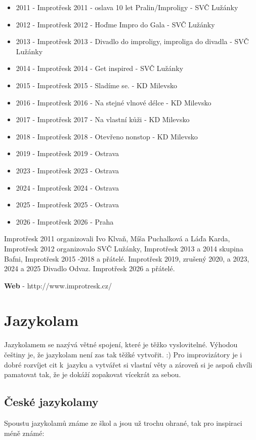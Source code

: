 \begin{itemize}
\item 2011 - Improtřesk 2011 - oslava 10 let Pralin/Improligy - SVČ Lužánky
\item 2012 - Improtřesk 2012 - Hoďme Impro do Gala - SVČ Lužánky
\item 2013 - Improtřesk 2013 - Divadlo do improligy, improliga do divadla - SVČ Lužánky
\item 2014 - Improtřesk 2014 - Get inspired - SVČ Lužánky
\item 2015 - Improtřesk 2015 - Sladíme se. - KD Milevsko
\item 2016 - Improtřesk 2016 - Na stejné vlnové délce - KD Milevsko
\item 2017 - Improtřesk 2017 - Na vlastní kůži - KD Milevsko
\item 2018 - Improtřesk 2018 - Otevřeno nonstop - KD Milevsko
\item 2019 - Improtřesk 2019 - Ostrava
\item 2023 - Improtřesk 2023 - Ostrava
\item 2024 - Improtřesk 2024 - Ostrava
\item 2025 - Improtřesk 2025 - Ostrava
\item 2026 - Improtřesk 2026 - Praha
\end{itemize}
 
Improtřesk 2011 organizovali Ivo Klvaň, Míša Puchalková a Láďa Karda, 
Improtřesk 2012 organizovalo SVČ Lužánky,  
Improtřesk 2013 a 2014 skupina Bafni, 
Improtřesk 2015 -2018   a přátelé. 
Improtřesk 2019, zrušený 2020, a 2023, 2024 a 2025 Divadlo Odvaz. 
Improtřesk 2026  a přátelé. 
 
\textbf{Web} - http://www.improtresk.cz/ 
\needspace{5cm} \section{Jazykolam} \label{jazykolam} Jazykolamem se nazývá větné spojení, které je těžko vyslovitelné. Výhodou češtiny je, že jazykolam není zas tak těžké vytvořit. :) 
Pro improvizátory je i dobré rozvíjet cit k~jazyku a vytvářet si vlastní věty a zároveň si je aspoň chvíli pamatovat tak, že je dokáží zopakovat vícekrát za sebou. 
 
 
\subsection{ České jazykolamy }  
Spoustu jazykolamů známe ze škol a jsou už trochu ohrané, tak pro inspiraci méně známé: 
 
